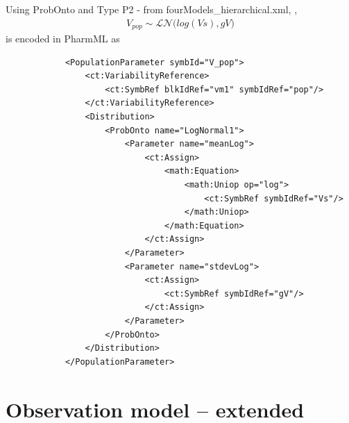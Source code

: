 \begin{example}
Using ProbOnto and Type P2 - from fourModels\_hierarchical.xml, \cite{LavielleFourModels:2014},
\begin{align*}
	V_{pop} \sim \mathcal {LN}\big(log(V\!s), gV\big)
\end{align*}
is encoded in PharmML as
\lstset{language=XML}
\begin{lstlisting}
            <PopulationParameter symbId="V_pop">
                <ct:VariabilityReference>
                    <ct:SymbRef blkIdRef="vm1" symbIdRef="pop"/>
                </ct:VariabilityReference>
                <Distribution>
                    <ProbOnto name="LogNormal1">
                        <Parameter name="meanLog">
                            <ct:Assign>
                                <math:Equation>
                                    <math:Uniop op="log">
                                        <ct:SymbRef symbIdRef="Vs"/>
                                    </math:Uniop>
                                </math:Equation>
                            </ct:Assign>
                        </Parameter>
                        <Parameter name="stdevLog">
                            <ct:Assign>
                                <ct:SymbRef symbIdRef="gV"/>
                            </ct:Assign>
                        </Parameter>
                    </ProbOnto>
                </Distribution>
            </PopulationParameter>
\end{lstlisting}
\end{example}

\section{Observation model -- extended}
\label{sec:observationModel}


